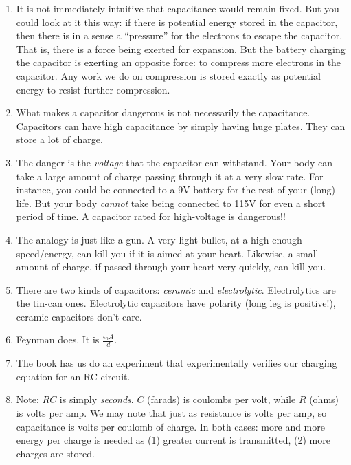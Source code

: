 \documentclass[11pt, oneside]{amsart}
\begin{document}
\begin{enumerate}
  \item It is not immediately intuitive that capacitance would remain
  fixed. But you could look at it this way: if there is potential energy
  stored in the capacitor, then there is in a sense a ``pressure'' for
  the electrons to escape the capacitor. That is, there is a force being
  exerted for expansion. But the battery charging the capacitor is
  exerting an opposite force: to compress more electrons in the
  capacitor. Any work we do on compression is stored exactly as
  potential energy to resist further compression.

  \item What makes a capacitor dangerous is not necessarily the
  capacitance. Capacitors can have high capacitance by simply having
  huge plates. They can store a lot of charge.

  \item The danger is the \emph{voltage} that the capacitor can
  withstand. Your body can take a large amount of charge passing through
  it at a very slow rate. For instance, you could be connected to a 9V
  battery for the rest of your (long) life. But your body \emph{cannot}
  take being connected to 115V for even a short period of time. A
  capacitor rated for high-voltage is dangerous!!

  \item The analogy is just like a gun. A very light bullet, at a high
  enough speed/energy, can kill you if it is aimed at your heart.
  Likewise, a small amount of charge, if passed through your heart very
  quickly, can kill you.

  \item There are two kinds of capacitors: \emph{ceramic} and
  \emph{electrolytic}. Electrolytics are the tin-can ones. Electrolytic
  capacitors have polarity (long leg is positive!), ceramic capacitors
  don't care. 

  \item {} Feynman does.
  It is $\frac{\epsilon_0 A}{d}$.

  \item The book has us do an experiment that experimentally verifies
  our charging equation for an RC circuit.

  \item Note: $RC$ is simply \emph{seconds}. $C$ (farads) is coulombs
  per volt, while $R$ (ohms) is volts per amp. We may note that just as
  resistance is volts per amp, so capacitance is volts per coulomb of
  charge. In both cases: more and more energy per charge is needed as
  (1) greater current is transmitted, (2) more charges are stored.

\end{enumerate}
\end{document}
